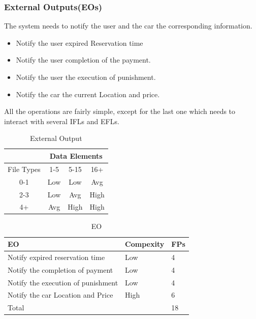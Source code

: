 \documentclass{article}
\begin{document}
	\subsubsection{External Outputs(EOs)}
	The  system needs to notify the user and the car the corresponding information. 
	\begin{itemize}
		\item Notify the user expired Reservation time 
		\item Notify the user completion of the payment.
		\item Notify the user the execution of punishment. 
		\item Notify the car the current Location and price.
	\end{itemize}
All the operations are fairly simple, except for the last one which needs to interact with several IFLs and EFLs.
	\begin{table}[h]
	\centering
	\caption{External Output}
	\label{my-label}
	\begin{tabular}{|c|l|c|c|c|}
		\hline
		\multicolumn{2}{|c|}{}           & \multicolumn{3}{c|}{Data Elements} \\ \hline
		\multicolumn{2}{|c|}{File Types} & 1-5       & 5-15       & 16+       \\ \hline
		\multicolumn{2}{|c|}{0-1}        & Low       & Low        & Avg       \\ \hline
		\multicolumn{2}{|c|}{2-3}        & Low       & Avg        & High      \\ \hline
		\multicolumn{2}{|c|}{4+}         & Avg       & High       & High      \\ \hline
	\end{tabular}
\end{table}
\begin{table}[h]
	\centering
	\caption{EO}
	\label{my-label}
	\begin{tabular}{|l|l|l|}
		\hline
		EO                                 & Compexity & FPs \\ \hline
		Notify expired reservation time    & Low       & 4   \\ \hline
		Notify the completion of payment   & Low       & 4   \\ \hline
		Notify the execution of punishment & Low       & 4   \\ \hline
		Notify the car Location and Price  & High      & 6   \\ \hline
		\multicolumn{2}{|l|}{Total}                    & 18  \\ \hline
	\end{tabular}
\end{table}
\newpage
\end{document}
